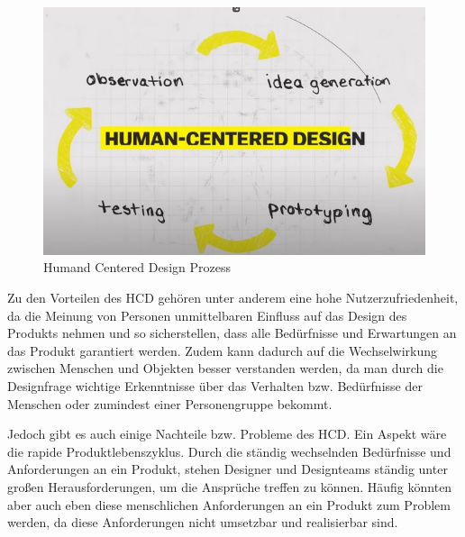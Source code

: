\begin{figure}[h]
    \centering
    \includegraphics[width=1\textwidth]{images/03/HCD.jpg}
    \caption{Humand Centered Design Prozess}
\end{figure}

Zu den Vorteilen des \acs{HCD} gehören unter anderem eine hohe Nutzerzufriedenheit, da die Meinung von Personen unmittelbaren Einfluss auf das Design des Produkts nehmen und so sicherstellen, dass alle Bedürfnisse und Erwartungen an das Produkt garantiert werden. Zudem kann dadurch auf die Wechselwirkung zwischen Menschen und Objekten besser verstanden werden, da man durch die Designfrage wichtige Erkenntnisse über das Verhalten bzw. Bedürfnisse der Menschen oder zumindest einer Personengruppe bekommt.


Jedoch gibt es auch einige Nachteile bzw. Probleme des \acs{HCD}. Ein Aspekt wäre die rapide Produktlebenszyklus. Durch die ständig wechselnden Bedürfnisse und Anforderungen an ein Produkt, stehen Designer und Designteams ständig unter großen Herausforderungen, um die Ansprüche treffen zu können. Häufig könnten aber auch eben diese menschlichen Anforderungen an ein Produkt zum Problem werden, da diese Anforderungen nicht umsetzbar und realisierbar sind.\cite{pod:2016}

